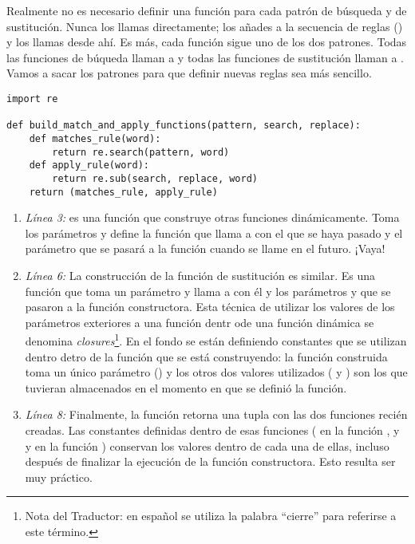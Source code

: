 Realmente no es necesario definir una función para cada patrón de búsqueda y de sustitución. Nunca los llamas directamente; los añades a la secuencia de reglas () y los llamas desde ahí. Es más, cada función sigue uno de los dos patrones. Todas las funciones de búqueda llaman a  y todas las funciones de sustitución llaman a . Vamos a sacar los patrones para que definir nuevas reglas sea más sencillo.

\noindent\begin{minipage}{\textwidth}
\begin{lstlisting}[mathescape=False]
import re

def build_match_and_apply_functions(pattern, search, replace):
    def matches_rule(word):
        return re.search(pattern, word)
    def apply_rule(word):
        return re.sub(search, replace, word)
    return (matches_rule, apply_rule)
\end{lstlisting}
\end{minipage}

\begin{enumerate}

\item \emph{Línea 3:}  es una función que construye otras funciones dinámicamente. Toma los parámetros y define la función  que llama a  con el  que se haya pasado y el parámetro  que se pasará a la función cuando se llame en el futuro. ¡Vaya!

\item \emph{Línea 6:} La construcción de la función de sustitución es similar. Es una función que toma un parámetro  y llama a  con él y los parámetros  y  que se pasaron a la función constructora. Esta técnica de utilizar los valores de los parámetros exteriores a una función dentr ode una función dinámica se denomina \emph{closures}\footnote{Nota del Traductor: en español se utiliza la palabra ``cierre'' para referirse a este término.}. En el fondo se están definiendo constantes que se utilizan dentro detro de la función que se está construyendo: la función construida toma un único parámetro () y los otros dos valores utilizados ( y ) son los que tuvieran almacenados en el momento en que se definió la función.

\item \emph{Línea 8:} Finalmente, la función retorna una tupla con las dos funciones recién creadas. Las constantes definidas dentro de esas funciones ( en la función , y  y  en la función ) conservan los valores dentro de cada una de ellas, incluso después de finalizar la ejecución de la función constructora. Esto resulta ser muy práctico.

\end{enumerate}

